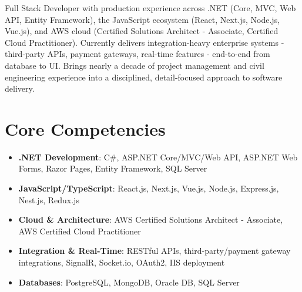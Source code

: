 \documentclass[11pt,a4paper,sans]{moderncv}
\begin{document}
\makecvtitle


\vspace{6pt}
\small{Full Stack Developer with production experience across .NET (Core, MVC, Web API, Entity Framework), the JavaScript ecosystem (React, Next.js, Node.js, Vue.js), and AWS cloud (Certified Solutions Architect - Associate, Certified Cloud Practitioner). Currently delivers integration-heavy enterprise systems - third-party APIs, payment gateways, real-time features - end-to-end from database to UI. Brings nearly a decade of project management and civil engineering experience into a disciplined, detail-focused approach to software delivery.}


\section{Core Competencies}
\vspace{1pt}
\begin{itemize}

\item \textbf{.NET Development}: C\#, ASP.NET Core/MVC/Web API, ASP.NET Web Forms, Razor Pages, Entity Framework, SQL Server

\item \textbf{JavaScript/TypeScript}: React.js, Next.js, Vue.js, Node.js, Express.js, Nest.js, Redux.js

\item \textbf{Cloud \& Architecture}: AWS Certified Solutions Architect - Associate, AWS Certified Cloud Practitioner

\item \textbf{Integration \& Real-Time}: RESTful APIs, third-party/payment gateway integrations, SignalR, Socket.io, OAuth2, IIS deployment

\item \textbf{Databases}: PostgreSQL, MongoDB, Oracle DB, SQL Server

\end{itemize}

\end{document}
